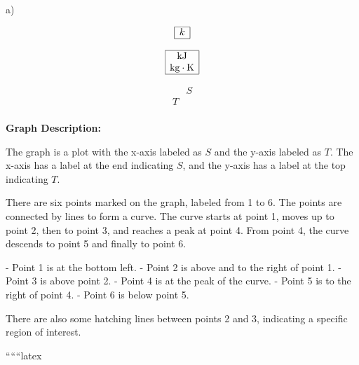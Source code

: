 a)

\[
\begin{array}{|c|}
\hline
k \\
\hline
\end{array}
\]

\[
\begin{array}{|c|}
\hline
\text{kJ} \\
\text{kg} \cdot \text{K} \\
\hline
\end{array}
\]

\[
\begin{array}{c|c}
 & S \\
\hline
T & \\
\end{array}
\]

\textbf{Graph Description:}

The graph is a plot with the x-axis labeled as \( S \) and the y-axis labeled as \( T \). The x-axis has a label at the end indicating \( S \), and the y-axis has a label at the top indicating \( T \). 

There are six points marked on the graph, labeled from 1 to 6. The points are connected by lines to form a curve. The curve starts at point 1, moves up to point 2, then to point 3, and reaches a peak at point 4. From point 4, the curve descends to point 5 and finally to point 6.

- Point 1 is at the bottom left.
- Point 2 is above and to the right of point 1.
- Point 3 is above point 2.
- Point 4 is at the peak of the curve.
- Point 5 is to the right of point 4.
- Point 6 is below point 5.

There are also some hatching lines between points 2 and 3, indicating a specific region of interest.

``````latex